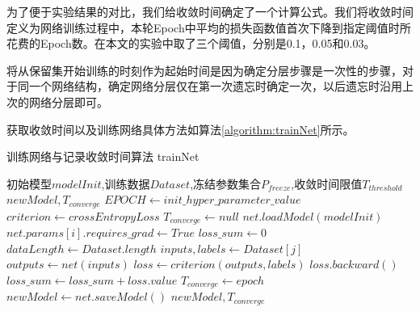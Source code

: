 为了便于实验结果的对比，我们给收敛时间确定了一个计算公式。我们将收敛时间定义为网络训练过程中，本轮Epoch中平均的损失函数值首次下降到指定阈值时所花费的Epoch数。在本文的实验中取了三个阈值，分别是0.1，0.05和0.03。

将从保留集开始训练的时刻作为起始时间是因为确定分层步骤是一次性的步骤，对于同一个网络结构，确定网络分层仅在第一次遗忘时确定一次，以后遗忘时沿用上次的网络分层即可。

获取收敛时间以及训练网络具体方法如算法\ref{algorithm:trainNet}所示。
\begin{algorithm}
	\renewcommand{\algorithmicrequire}{\textbf{Input:}}
	\renewcommand{\algorithmicensure}{\textbf{Output:}}
	\caption{训练网络与记录收敛时间算法  trainNet}
	\label{algorithm:trainNet}
	\begin{algorithmic}[1]
        \REQUIRE 初始模型$modelInit$,训练数据$Dataset$,冻结参数集合$P_{freeze}$,收敛时间限值$T_{threshold}$
        \ENSURE  $newModel,T_{converge} $
        \STATE $EPOCH \gets init\_hyper\_parameter\_value$
        \STATE $criterion \gets crossEntropyLoss$
        \STATE $T_{converge} \gets null$
        \STATE $net.loadModel(modelInit)$
                \STATE $net.params[i].requires\_grad \gets True$
            \ENDIF
        \ENDFOR
            \STATE $loss\_sum \gets 0$
            \STATE $dataLength \gets Dataset.length$
                \STATE $inputs,labels \gets Dataset[j]$
                \STATE $outputs \gets net(inputs)$
                \STATE $loss \gets criterion(outputs, labels)$
                \STATE $loss.backward()$
                \STATE $loss\_sum \gets loss\_sum + loss.value$
            \ENDFOR
                \STATE $T_{converge} \gets epoch$
            \ENDIF
        \ENDFOR
        \STATE $newModel \gets net.saveModel()$
        \RETURN $newModel, T_{converge}$
	\end{algorithmic}  
\end{algorithm}

